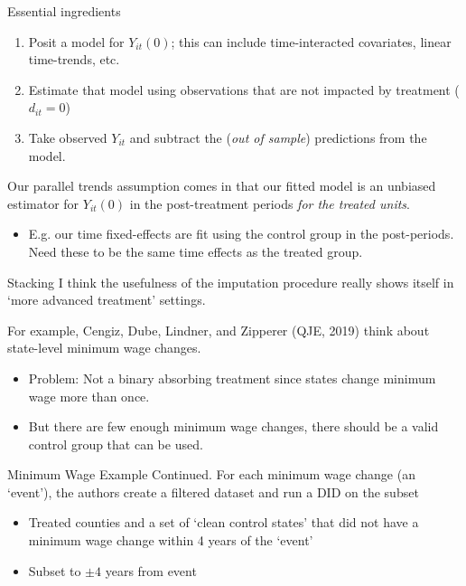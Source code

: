 \documentclass[t]{beamer}
\begin{document}
\begin{frame}{Essential ingredients}
  \begin{enumerate}
    \item Posit a model for $Y_{it}(0)$; this can include time-interacted covariates, linear time-trends, etc. 
    \item Estimate that model using observations that are not impacted by treatment ($d_{it} = 0$)
    \item Take observed $Y_{it}$ and subtract the (\emph{out of sample}) predictions from the model.
  \end{enumerate}

  \pause
  \bigskip
  Our parallel trends assumption comes in that our fitted model is an unbiased estimator for $Y_{it}(0)$ in the post-treatment periods \emph{for the treated units}. 
  \begin{itemize}
    \item E.g. our time fixed-effects are fit using the control group in the post-periods. Need these to be the same time effects as the treated group.
  \end{itemize}
\end{frame}



\begin{frame}{Stacking}
  I think the usefulness of the imputation procedure really shows itself in `more advanced treatment' settings. 
  
  \bigskip
  For example, Cengiz, Dube, Lindner, and Zipperer (QJE, 2019) think about state-level minimum wage changes. 
  \begin{itemize}
    \item Problem: Not a binary absorbing treatment since states change minimum wage more than once.
    
    \item But there are few enough minimum wage changes, there should be a valid control group that can be used.
  \end{itemize}
\end{frame}

\begin{frame}{Minimum Wage Example Continued.}
  \bigskip
  For each minimum wage change (an `event'), the authors create a filtered dataset and run a DID on the subset 
  \begin{itemize}
    \item Treated counties and a set of `clean control states' that did not have a minimum wage change within 4 years of the `event'
    \item Subset to $\pm 4$ years from event
  \end{itemize}
\end{frame}
\end{document}
